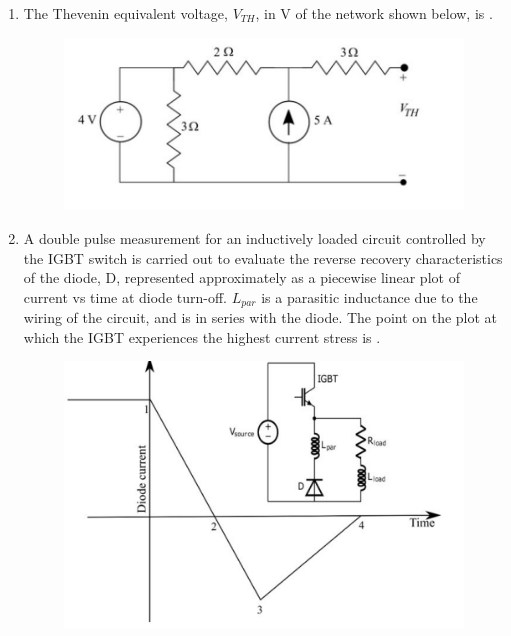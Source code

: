 \documentclass[journal,12pt,onecolumn]{IEEEtran}
\theoremstyle{remark}
\begin{document}
\begin{enumerate}[start=1, label=Q.\arabic*]
\hfill{}

\item The Thevenin equivalent voltage, $V_{TH}$, in V  of the network shown below, is \underline{\hspace{2cm}}.
\begin{figure}[H]
    \centering
    \includegraphics[width=0.6\columnwidth]{Figures/299.png}
    \caption{}
\end{figure}

\hfill{}

\item A double pulse measurement for an inductively loaded circuit controlled by the IGBT switch is carried out to evaluate the reverse recovery characteristics of the diode, D, represented approximately as a piecewise linear plot of current vs time at diode turn-off. $L_{par}$ is a parasitic inductance due to the wiring of the circuit, and is in series with the diode. The point on the plot  at which the IGBT experiences the highest current stress is \underline{\hspace{2cm}}.
\begin{figure}[H]
    \centering
    \includegraphics[width=0.8\columnwidth]{Figures/30.png}
    \caption{}
\end{figure}

\hfill{}


\end{enumerate}
\end{document}
